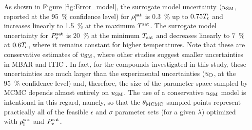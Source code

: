 \documentclass[preprint,letterpaper,floatfix,citeautoscript,aip,jcp]{revtex4-1}
\begin{document}


As shown in Figure \ref{fig:Error_model}, the surrogate model uncertainty $(u_{\rm SM}$, reported at the 95~\% confidence level) for $\rho_{\rm l}^{\rm sat}$ is 0.3~\% up to $0.75 T_{\rm c}$ and increases linearly to 1.5~\% at the maximum $T^{\rm sat}$. The surrogate model uncertainty for $P_{\rm v}^{\rm sat}$ is 20~\% at the minimum $T_{\rm sat}$ and decreases linearly to 7~\% at $0.6 T_{\rm c}$, where it remains constant for higher temperatures. Note that these are conservative estimates of $u_{\rm SM}$, where other studies suggest smaller uncertainties in MBAR and ITIC \cite{Mostafa_Diss,Mostafa2018,Postdoc_1}. In fact, for the compounds investigated in this study, these uncertainties are much larger than the experimental uncertainties ($u_{\rm D}$, at the 95~\% confidence level) \cite{TDE} and, therefore, the size of the parameter space sampled by MCMC depends almost entirely on $u_{\rm SM}$. The use of a conservative $u_{\rm SM}$ model is intentional in this regard, namely, so that the $\theta_{\rm MCMC}$ sampled points represent practically all of the feasible $\epsilon$ and $\sigma$ parameter sets (for a given $\lambda$) optimized with $\rho_{\rm l}^{\rm sat}$ and $P_{\rm v}^{\rm sat}$. 
\end{document}

